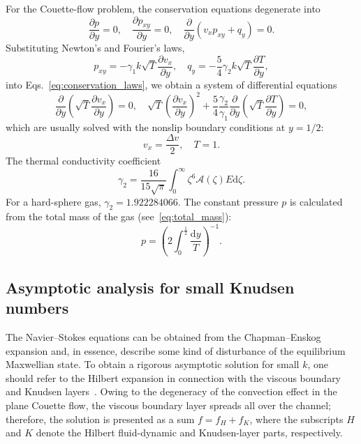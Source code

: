 \documentclass[]{elsarticle} %
\newcommand{\dd}{\mathrm{d}}
\newcommand{\pder}[2][]{\frac{\partial#1}{\partial#2}}
\begin{document}
For the Couette-flow problem, the conservation equations degenerate into
\begin{equation}\label{eq:conservation_laws}
    \pder[p]{y} = 0, \quad \pder[p_{xy}]{y} = 0, \quad \pder{y}(v_x p_{xy} + q_y) = 0.
\end{equation}
Substituting Newton's and Fourier's laws,
\begin{equation}\label{eq:Newton-Fourier}
    p_{xy} = -\gamma_1 k\sqrt{T}\pder[v_x]{y}, \quad q_y = -\frac54\gamma_2 k\sqrt{T}\pder[T]{y},
\end{equation}
into Eqs.~\eqref{eq:conservation_laws}, we obtain a system of differential equations
\begin{equation}\label{eq:Navier-Stokes}
    \pder{y}\left(\sqrt{T}\pder[v_x]{y}\right) = 0, \quad
    \sqrt{T}\left(\pder[v_x]{y}\right)^2 + \frac54\frac{\gamma_2}{\gamma_1}\pder{y}\left(\sqrt{T}\pder[T]{y}\right) = 0,
\end{equation}
which are usually solved with the nonslip boundary conditions at \(y=1/2\):
\begin{equation}\label{eq:nonslip_bc}
    v_x = \frac{\Delta{v}}2, \quad T = 1.
\end{equation}
The thermal conductivity coefficient
\begin{equation}\label{eq:gamma_2}
    \gamma_2 = \frac{16}{15\sqrt{\pi}}\int_0^\infty \zeta^6 \mathcal{A}(\zeta)E\dd\zeta.
\end{equation}
For a hard-sphere gas, \(\gamma_2 = 1.922284066\).
The constant pressure \(p\) is calculated from the total mass of the gas (see~\eqref{eq:total_mass}):
\begin{equation}\label{eq:constant_pressure}
    p = \left( 2\int_{0}^\frac12\frac{\dd{y}}{T} \right)^{-1}.
\end{equation}

\subsection{Asymptotic analysis for small Knudsen numbers}

The Navier--Stokes equations can be obtained from the Chapman--Enskog expansion
and, in essence, describe some kind of disturbance of the equilibrium Maxwellian state.
To obtain a rigorous asymptotic solution for small \(k\),
one should refer to the Hilbert expansion in connection with the
viscous boundary and Knudsen layers~\citep{Sone2000, Sone2002}.
Owing to the degeneracy of the convection effect in the plane Couette flow,
the viscous boundary layer spreads all over the channel;
therefore, the solution is presented as a sum \(f = f_H + f_K\),
where the subscripts \(H\) and \(K\) denote the Hilbert fluid-dynamic and Knudsen-layer parts, respectively.
\end{document}
